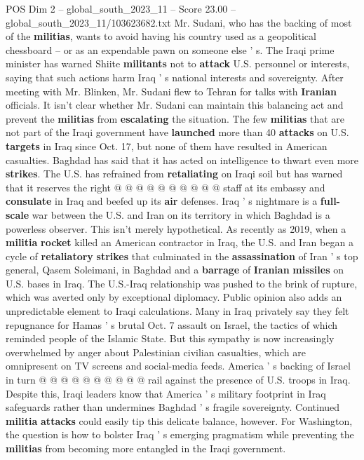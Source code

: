 \begin{textsample}{POS Dim 2 – global\_south\_2023\_11 – Score 23.00 – global\_south\_2023\_11/103623682.txt}
Mr.
Sudani, who has the backing of most of the \textbf{militias}, wants to avoid having his country used as a geopolitical chessboard -- or as an expendable pawn on someone else ' s.
The Iraqi prime minister has warned Shiite \textbf{militants} not to \textbf{attack} U.S. personnel or interests, saying that such actions harm Iraq ' s national interests and sovereignty.
After meeting with Mr.
Blinken, Mr.
Sudani flew to Tehran for talks with \textbf{Iranian} officials.
It isn't clear whether Mr.
Sudani can maintain this balancing act and prevent the \textbf{militias} from \textbf{escalating} the situation.
The few \textbf{militias} that are not part of the Iraqi government have \textbf{launched} more than 40 \textbf{attacks} on U.S. \textbf{targets} in Iraq since Oct. 17, but none of them have resulted in American casualties.
Baghdad has said that it has acted on intelligence to thwart even more \textbf{strikes}.
The U.S. has refrained from \textbf{retaliating} on Iraqi soil but has warned that it reserves the right @ @ @ @ @ @ @ @ @ @ staff at its embassy and \textbf{consulate} in Iraq and beefed up its \textbf{air} defenses.
Iraq ' s nightmare is a \textbf{full-scale} war between the U.S. and Iran on its territory in which Baghdad is a powerless observer.
This isn't merely hypothetical.
As recently as 2019, when a \textbf{militia} \textbf{rocket} killed an American contractor in Iraq, the U.S. and Iran began a cycle of \textbf{retaliatory} \textbf{strikes} that culminated in the \textbf{assassination} of Iran ' s top general, Qasem Soleimani, in Baghdad and a \textbf{barrage} of \textbf{Iranian} \textbf{missiles} on U.S. bases in Iraq.
The U.S.-Iraq relationship was pushed to the brink of rupture, which was averted only by exceptional diplomacy.
Public opinion also adds an unpredictable element to Iraqi calculations.
Many in Iraq privately say they felt repugnance for Hamas ' s brutal Oct. 7 assault on Israel, the tactics of which reminded people of the Islamic State.
But this sympathy is now increasingly overwhelmed by anger about Palestinian civilian casualties, which are omnipresent on TV screens and social-media feeds.
America ' s backing of Israel in turn @ @ @ @ @ @ @ @ @ @ rail against the presence of U.S. troops in Iraq.
Despite this, Iraqi leaders know that America ' s military footprint in Iraq safeguards rather than undermines Baghdad ' s fragile sovereignty.
Continued \textbf{militia} \textbf{attacks} could easily tip this delicate balance, however.
For Washington, the question is how to bolster Iraq ' s emerging pragmatism while preventing the \textbf{militias} from becoming more entangled in the Iraqi government.

\end{textsample}
